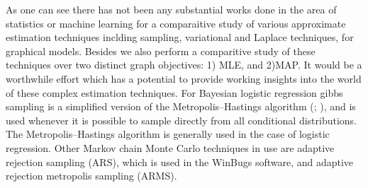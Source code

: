 As one can see there has not been any substantial works done in the area of
statistics or machine learning for a comparaitive study of various approximate
estimation techniques inclding sampling, variational and Laplace techniques, for
graphical models. Besides we also perform a comparitive study of these
techniques over two distinct graph objectives: 1) MLE, and 2)MAP. It
would be a worthwhile effort which has a potential to provide working insights
into the world of these complex estimation techniques. For Bayesian logistic
regression gibbs sampling is a simplified version of the Metropolis–Hastings
algorithm (\cite{Metropolis53}; \cite{Hastings70}), and is used whenever it is
possible to sample directly from all conditional distributions. The Metropolis–Hastings algorithm
is generally used in the case of logistic regression. Other Markov chain
Monte Carlo techniques in use are adaptive rejection sampling (ARS), which is used in the WinBugs
software, and adaptive rejection metropolis sampling (ARMS).


